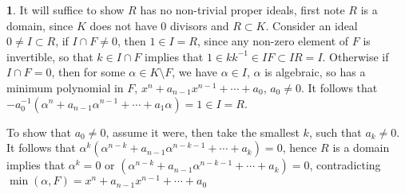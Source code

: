 \documentclass[11pt]{article}
\theoremstyle{definition}
\newtheorem{pb}{}
\newcommand{\tor}{\text{ or }}
\begin{document}
    \begin{pb}
        It will suffice to show \(R \) has no non-trivial proper ideals, first note \(R\) is a domain, since \(K \) does not have \(0\) divisors and \(R \subset K\). 
        Consider an ideal \(0 \neq I \subset R\), if \(I \cap F \neq 0\), then \(1 \in I = R\), since
        any non-zero element of \(F \) is invertible, so that \(k \in I\cap F\) implies that \(1 \in k k^{-1}\in IF \subset IR = I\). Otherwise if \(I \cap F = 0\), then for some \(\alpha \in K \setminus F \), we have \(\alpha \in I \), \(\alpha\) is algebraic, so
        has a minimum polynomial in \(F\), \(x^n + a_{n-1}x^{n-1} + \cdots + a_0\), \(a_0 \neq 0\). It follows that \(-a_0^{-1}(\alpha^n + a_{n-1}\alpha^{n-1} + \cdots + a_1 \alpha) = 1 \in I = R\).

        To show that \(a_0 \neq 0\), assume it were, then take the smallest \(k \), such that \(a_k \neq 0\). It follows that \(\alpha^k(\alpha^{n-k} + a_{n-1}\alpha^{n-k-1} + \cdots + a_k) = 0\),
        hence \(R \) is a domain implies that \(\alpha^k = 0 \tor (\alpha^{n-k} + a_{n-1}\alpha^{n-k-1} + \cdots + a_k) = 0\), contradicting \(\min(\alpha,F) = x^n + a_{n-1}x^{n-1} + \cdots + a_0\)
    \end{pb}
\end{document}
